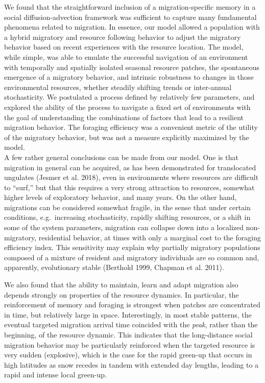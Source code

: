 \documentclass[12pt]{article}
\begin{document}
We found that the straightforward inclusion of a migration-specific
memory in a social diffusion-advection framework was sufficient to
capture many fundamental phenomena related to migration. In essence, our
model allowed a population with a hybrid migratory and resource
following behavior to adjust the migratory behavior based on recent
experiences with the resource location. The model, while simple, was
able to emulate the successful navigation of an environment with
temporally and spatially isolated seasonal resource patches, the
spontaneous emergence of a migratory behavior, and intrinsic robustness
to changes in those environmental resources, whether steadily shifting
trends or inter-annual stochasticity. We postulated a process defined by
relatively few parameters, and explored the ability of the process to
navigate a fixed set of environments with the goal of understanding the
combinations of factors that lead to a resilient migration behavior. The
foraging efficiency was a convenient metric of the utility of the
migratory behavior, but was not a measure explicitly maximized by the
model.\\
A few rather general conclusions can be made from our model. One is that
migration in general can be acquired, as has been demonstrated for
translocated ungulates (Jesmer et al. 2018), even in environments where
resources are difficult to ``surf,'' but that this requires a very
strong attraction to resources, somewhat higher levels of exploratory
behavior, and many years. On the other hand, migrations can be
considered somewhat fragile, in the sense that under certain conditions,
e.g.~increasing stochasticity, rapidly shifting resources, or a shift in
some of the system parameters, migration can collapse down into a
localized non-migratory, residential behavior, at times with only a
marginal cost to the foraging efficiency index. This sensitivity may
explain why partially migratory populations composed of a mixture of
resident and migratory individuals are so common and, apparently,
evolutionary stable (Berthold 1999, Chapman et al. 2011).

We also found that the ability to maintain, learn and adapt migration
also depends strongly on properties of the resource dynamics. In
particular, the reinforcement of memory and foraging is strongest when
patches are concentrated in time, but relatively large in space.
Interestingly, in most stable patterns, the eventual targeted migration
arrival time coincided with the \emph{peak}, rather than the beginning,
of the resource dynamic. This indicates that the long-distance social
migration behavior may be particularly reinforced when the targeted
resource is very sudden (explosive), which is the case for the rapid
green-up that occurs in high latitudes as snow recedes in tandem with
extended day lengths, leading to a rapid and intense local green-up.
\end{document}
